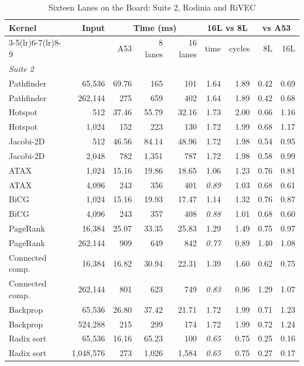 \begin{table}[p]
\caption{Sixteen Lanes on the Board: Suite 2, Rodinia and RiVEC}
\label{tab:lanes16_board_all2}
\centering\footnotesize
\setlength{\tabcolsep}{4pt}
\begin{tabular}{lrrrrrrrr}
\toprule
Kernel & Input & \multicolumn{3}{c}{Time (ms)} & \multicolumn{2}{c}{16L vs 8L} & \multicolumn{2}{c}{vs A53}\\
\cmidrule(lr){3-5}\cmidrule(lr){6-7}\cmidrule(lr){8-9}
 & & A53 & 8 lanes & 16 lanes & time & cycles & 8L & 16L\\
\midrule
\multicolumn{9}{l}{\textit{Suite 2}}\\
Pathfinder & 65{,}536 & 69.76 & 165 & 101 & 1.64 & 1.89 & 0.42 & 0.69\\
Pathfinder & 262{,}144 & 275 & 659 & 402 & 1.64 & 1.89 & 0.42 & 0.68\\
Hotspot & 512 & 37.46 & 55.79 & 32.16 & 1.73 & 2.00 & 0.66 & 1.16\\
Hotspot & 1{,}024 & 152 & 223 & 130 & 1.72 & 1.99 & 0.68 & 1.17\\
Jacobi-2D & 512 & 46.56 & 84.14 & 48.96 & 1.72 & 1.98 & 0.54 & 0.95\\
Jacobi-2D & 2{,}048 & 782 & 1{,}351 & 787 & 1.72 & 1.98 & 0.58 & 0.99\\
ATAX & 1{,}024 & 15.16 & 19.86 & 18.65 & 1.06 & 1.23 & 0.76 & 0.81\\
ATAX & 4{,}096 & 243 & 356 & 401 & \textit{0.89} & 1.03 & 0.68 & 0.61\\
BiCG & 1{,}024 & 15.16 & 19.93 & 17.47 & 1.14 & 1.32 & 0.76 & 0.87\\
BiCG & 4{,}096 & 243 & 357 & 408 & \textit{0.88} & 1.01 & 0.68 & 0.60\\
PageRank & 16{,}384 & 25.07 & 33.35 & 25.83 & 1.29 & 1.49 & 0.75 & 0.97\\
PageRank & 262{,}144 & 909 & 649 & 842 & \textit{0.77} & 0.89 & 1.40 & 1.08\\
Connected comp. & 16{,}384 & 16.82 & 30.94 & 22.31 & 1.39 & 1.60 & 0.62 & 0.75\\
Connected comp. & 262{,}144 & 801 & 623 & 749 & \textit{0.83} & 0.96 & 1.29 & 1.07\\
Backprop & 65{,}536 & 26.80 & 37.42 & 21.71 & 1.72 & 1.99 & 0.71 & 1.23\\
Backprop & 524{,}288 & 215 & 299 & 174 & 1.72 & 1.99 & 0.72 & 1.24\\
Radix sort & 65{,}536 & 16.16 & 65.23 & 100 & \textit{0.65} & 0.75 & 0.25 & 0.16\\
Radix sort & 1{,}048{,}576 & 273 & 1{,}026 & 1{,}584 & \textit{0.65} & 0.75 & 0.27 & 0.17\\

\end{tabular}
\end{table}
